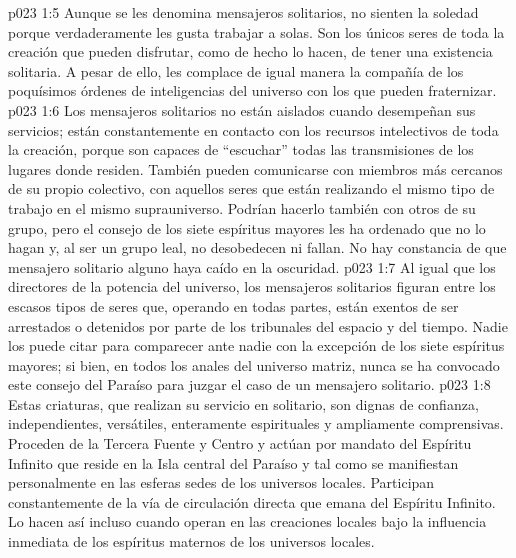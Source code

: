 \vs p023 1:5 Aunque se les denomina mensajeros solitarios, no sienten la soledad porque verdaderamente les gusta trabajar a solas. Son los únicos seres de toda la creación que pueden disfrutar, como de hecho lo hacen, de tener una existencia solitaria. A pesar de ello, les complace de igual manera la compañía de los poquísimos órdenes de inteligencias del universo con los que pueden fraternizar.
\vs p023 1:6 \pc Los mensajeros solitarios no están aislados cuando desempeñan sus servicios; están constantemente en contacto con los recursos intelectivos de toda la creación, porque son capaces de “escuchar” todas las transmisiones de los lugares donde residen. También pueden comunicarse con miembros más cercanos de su propio colectivo, con aquellos seres que están realizando el mismo tipo de trabajo en el mismo suprauniverso. Podrían hacerlo también con otros de su grupo, pero el consejo de los siete espíritus mayores les ha ordenado que no lo hagan y, al ser un grupo leal, no desobedecen ni fallan. No hay constancia de que mensajero solitario alguno haya caído en la oscuridad.
\vs p023 1:7 Al igual que los directores de la potencia del universo, los mensajeros solitarios figuran entre los escasos tipos de seres que, operando en todas partes, están exentos de ser arrestados o detenidos por parte de los tribunales del espacio y del tiempo. Nadie los puede citar para comparecer ante nadie con la excepción de los siete espíritus mayores; si bien, en todos los anales del universo matriz, nunca se ha convocado este consejo del Paraíso para juzgar el caso de un mensajero solitario.
\vs p023 1:8 Estas criaturas, que realizan su servicio en solitario, son dignas de confianza, independientes, versátiles, enteramente espirituales y ampliamente comprensivas. Proceden de la Tercera Fuente y Centro y actúan por mandato del Espíritu Infinito que reside en la Isla central del Paraíso y tal como se manifiestan personalmente en las esferas sedes de los universos locales. Participan constantemente de la vía de circulación directa que emana del Espíritu Infinito. Lo hacen así incluso cuando operan en las creaciones locales bajo la influencia inmediata de los espíritus maternos de los universos locales.
